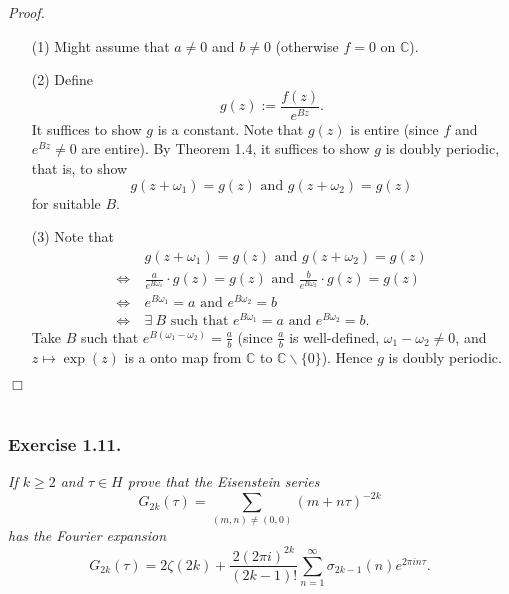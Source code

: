 \documentclass{article}
\begin{document}
\emph{Proof.}
\begin{enumerate}
\item[(1)]
  Might assume that $a \neq 0$ and $b \neq 0$
  (otherwise $f = 0$ on $\mathbb{C}$).

\item[(2)]
  Define
  \[
    g(z) := \frac{f(z)}{e^{Bz}}.
  \]
  It suffices to show $g$ is a constant.
  Note that $g(z)$ is entire (since $f$ and $e^{Bz} \neq 0$ are entire).
  By Theorem 1.4, it suffices to show $g$ is doubly periodic, that is,
  to show
  \[
    g(z+\omega_1) = g(z) \text{ and } g(z+\omega_2) = g(z)
  \]
  for suitable $B$.

\item[(3)]
  Note that
  \begin{align*}
    &\:
    g(z+\omega_1) = g(z) \text{ and } g(z+\omega_2) = g(z) \\
    \Longleftrightarrow & \:
    \frac{a}{e^{B\omega_1}} \cdot g(z) = g(z)
      \text{ and } \frac{b}{e^{B\omega_2}} \cdot g(z) = g(z) \\
    \Longleftrightarrow & \:
    e^{B\omega_1} = a \text{ and } e^{B\omega_2} = b \\
    \Longleftrightarrow & \:
    \text{$\exists \: B$ such that $e^{B\omega_1} = a$ and $e^{B\omega_2} = b$}.
  \end{align*}
  Take $B$ such that $e^{B(\omega_1 - \omega_2)} = \frac{a}{b}$
  (since $\frac{a}{b}$ is well-defined, $\omega_1 - \omega_2 \neq 0$,
  and $z \mapsto \exp(z)$ is a onto map from $\mathbb{C}$ to $\mathbb{C} \smallsetminus \{0\}$).
  Hence $g$ is doubly periodic.
\end{enumerate}
$\Box$ \\\\






\subsubsection*{Exercise 1.11.}
\emph{If $k \geq 2$ and $\tau \in H$ prove that the Eisenstein series
\[
  G_{2k}(\tau)
  = \sum_{(m,n) \neq (0,0)} (m+n\tau)^{-2k}
\]
has the Fourier expansion
}
\[
  G_{2k}(\tau)
  =
  2 \zeta(2k) + \frac{2(2\pi i)^{2k}}{(2k-1)!} \sum_{n=1}^{\infty} \sigma_{2k-1}(n) e^{2\pi i n \tau}.
\] \\
\end{document}
